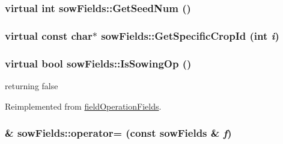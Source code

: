 \label{classsow_fields_a958ec0bc5d51ebaa5f13c27dcb1d3620}
\hypertarget{classsow_fields_af361db1618e35471eaed378178d3b554}{
\subsubsection[{GetSeedNum}]{\setlength{\rightskip}{0pt plus 5cm}virtual int sowFields::GetSeedNum ()}}
\label{classsow_fields_af361db1618e35471eaed378178d3b554}
\hypertarget{classsow_fields_a06b3d15e4ff9644953e4e0a39cfb53cc}{
\subsubsection[{GetSpecificCropId}]{\setlength{\rightskip}{0pt plus 5cm}virtual const char$\ast$ sowFields::GetSpecificCropId (int {\em i})}}
\label{classsow_fields_a06b3d15e4ff9644953e4e0a39cfb53cc}
\hypertarget{classsow_fields_ac2784f943d1fc9ffd9f831ed792da834}{
\subsubsection[{IsSowingOp}]{\setlength{\rightskip}{0pt plus 5cm}virtual bool sowFields::IsSowingOp ()}}
\label{classsow_fields_ac2784f943d1fc9ffd9f831ed792da834}


returning false 

Reimplemented from \hyperlink{classfield_operation_fields_a223d85319e913d2337715db404a47c4f}{fieldOperationFields}.\hypertarget{classsow_fields_abc76f0e726ab2388e9f9be21d6c0b8be}{
\subsubsection[{operator=}]{\& sowFields::operator= (const {\bf sowFields} \& {\em f})}}
\label{classsow_fields_abc76f0e726ab2388e9f9be21d6c0b8be}


